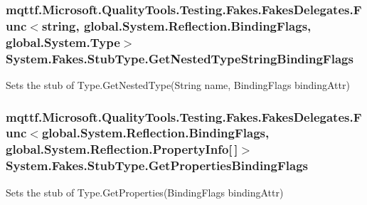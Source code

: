 \hypertarget{class_system_1_1_fakes_1_1_stub_type_a8461d11125d0330dccfbc9996c5b721a}{
\subsubsection[{Get\-Nested\-Type\-String\-Binding\-Flags}]{\setlength{\rightskip}{0pt plus 5cm}mqttf.\-Microsoft.\-Quality\-Tools.\-Testing.\-Fakes.\-Fakes\-Delegates.\-Func$<$string, global.\-System.\-Reflection.\-Binding\-Flags, global.\-System.\-Type$>$ System.\-Fakes.\-Stub\-Type.\-Get\-Nested\-Type\-String\-Binding\-Flags}}\label{class_system_1_1_fakes_1_1_stub_type_a8461d11125d0330dccfbc9996c5b721a}


Sets the stub of Type.\-Get\-Nested\-Type(\-String name, Binding\-Flags binding\-Attr)

\hypertarget{class_system_1_1_fakes_1_1_stub_type_a3f32427292b741aedae7c277722e6e2b}{
\subsubsection[{Get\-Properties\-Binding\-Flags}]{\setlength{\rightskip}{0pt plus 5cm}mqttf.\-Microsoft.\-Quality\-Tools.\-Testing.\-Fakes.\-Fakes\-Delegates.\-Func$<$global.\-System.\-Reflection.\-Binding\-Flags, global.\-System.\-Reflection.\-Property\-Info\mbox{[}$\,$\mbox{]}$>$ System.\-Fakes.\-Stub\-Type.\-Get\-Properties\-Binding\-Flags}}\label{class_system_1_1_fakes_1_1_stub_type_a3f32427292b741aedae7c277722e6e2b}


Sets the stub of Type.\-Get\-Properties(\-Binding\-Flags binding\-Attr)

